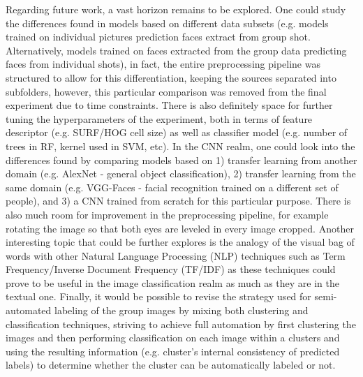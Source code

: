 \documentclass[11pt]{article}
\begin{document}
    Regarding future work, a vast horizon remains to be explored. One could study the differences found in models based on different data subsets (e.g. models trained on individual pictures prediction faces extract from group shot. Alternatively, models trained on faces extracted from the group data predicting faces from individual shots), in fact, the entire preprocessing pipeline was structured to allow for this differentiation, keeping the sources separated into subfolders, however, this particular comparison was removed from the final experiment due to time constraints. There is also definitely space for further tuning the hyperparameters of the experiment, both in terms of feature descriptor (e.g. SURF/HOG cell size) as well as classifier model (e.g. number of trees in RF, kernel used in SVM, etc). In the CNN realm, one could look into the differences found by comparing models based on 1) transfer learning from another domain (e.g. AlexNet - general object classification), 2) transfer learning from the same domain (e.g. VGG-Faces - facial recognition trained on a different set of people), and 3) a CNN trained from scratch for this particular purpose. There is also much room for improvement in the preprocessing pipeline, for example rotating the image so that both eyes are leveled in every image cropped. Another interesting topic that could be further explores is the analogy of the visual bag of words with other Natural Language Processing (NLP) techniques such as Term Frequency/Inverse Document Frequency (TF/IDF) as these techniques could prove to be useful in the image classification realm as much as they are in the textual one. Finally, it would be possible to revise the strategy used for semi-automated labeling of the group images by mixing both clustering and classification techniques, striving to achieve full automation by first clustering the images and then performing classification on each image within a clusters and using the resulting information (e.g. cluster's internal consistency of predicted labels) to determine whether the cluster can be automatically labeled or not.
\end{document}
